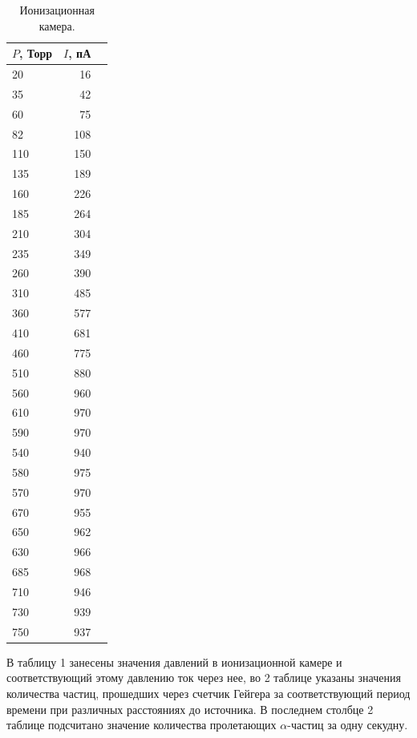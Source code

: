 \documentclass[a4paper,12pt]{article} %
\begin{document}
		\begin{table}[H]
			\caption{Ионизационная камера.}
			\label{table:exp3}
			\begin{tabular}{|l|r|r|}
				\hline
				$P$, Торр &    $I$, пА \\
				\hline
				 20 &   16 \\ \hline 
				 35 &   42 \\ \hline 
				 60 &   75 \\ \hline 
				 82 &  108 \\ \hline 
				110 &  150 \\ \hline 
				135 &  189 \\ \hline 
				160 &  226 \\ \hline 
				185 &  264 \\ \hline 
				210 &  304 \\ \hline 
				235 &  349 \\ \hline 
				260 &  390 \\ \hline 
				310 &  485 \\ \hline 
				360 &  577 \\ \hline 
				410 &  681 \\ \hline 
				460 &  775 \\ \hline 
				510 &  880 \\ \hline 
				560 &  960 \\ \hline 
				610 &  970 \\ \hline 
				590 &  970 \\ \hline 
				540 &  940 \\ \hline 
				580 &  975 \\ \hline 
				570 &  970 \\ \hline 
				670 &  955 \\ \hline 
				650 &  962 \\ \hline 
				630 &  966 \\ \hline 
				685 &  968 \\ \hline 
				710 &  946 \\ \hline 
				730 &  939 \\ \hline 
				750 &  937 \\ \hline 
				\end{tabular}
		\end{table}
	
	В таблицу 1 занесены значения давлений в ионизационной камере и соответствующий этому давлению ток через нее, во 2 таблице указаны значения количества частиц, прошедших через счетчик Гейгера за соответствующий период времени при различных расстояниях до источника. В последнем столбце 2 таблице подсчитано значение количества пролетающих $\alpha$-частиц за одну секудну.
\end{document}
